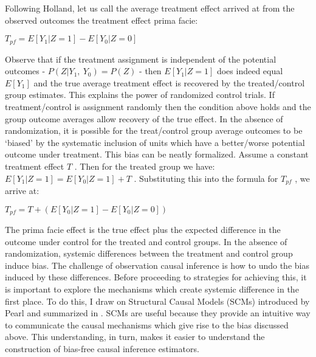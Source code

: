 \documentclass[../main.tex]{subfiles}
\begin{document}
\vspace{\baselineskip}
Following Holland, let us call the average treatment effect arrived at from the observed outcomes the treatment effect prima facie:\par


\vspace{\baselineskip}
\begin{adjustwidth}{0.5in}{0.0in}
 \( T_{pf}=E \left[ Y_{1}  \vert  Z=1 \right]  - E \left[ Y_{0}  \vert  Z=0 \right]  \) \par

\end{adjustwidth}


\vspace{\baselineskip}
Observe that if the treatment assignment is independent of the potential outcomes -  \( P \left( Z  \vert  Y_{1},~Y_{0} \right)  = P \left( Z \right)  \)  - then  \( E \left[ Y_{1}  \vert  Z=1 \right]  \) does indeed equal  \( E \left[ Y_{1} \right]  \)  and the true average treatment effect is recovered by the treated/control group estimates. This explains the power of randomized control trials. If treatment/control is assignment randomly then the condition above holds and the group outcome averages allow recovery of the true effect. In the absence of randomization, it is possible for the treat/control group average outcomes to be ‘biased’ by the systematic inclusion of units which have a better/worse potential outcome under treatment. This bias can be neatly formalized. Assume a constant treatment effect  \( T \) . Then for the treated group we have:  \( E \left[ Y_{1}  \vert  Z=1 \right]  = E \left[ Y_{0}  \vert  Z=1 \right]  + T \) . Substituting this into the formula for  \( T_{pf} \) , we arrive at:\par


\vspace{\baselineskip}
\begin{adjustwidth}{0.5in}{0.0in}
 \( T_{pf} = T + \left( E \left[ Y_{0}  \vert  Z = 1 \right]  - E \left[ Y_{0}  \vert  Z =0 \right]  \right)  \) \par

\end{adjustwidth}


\vspace{\baselineskip}
The prima facie effect is the true effect plus the expected difference in the outcome under control for the treated and control groups. In the absence of randomization, systemic differences between the treatment and control group induce bias. The challenge of observation causal inference is how to undo the bias induced by these differences. Before proceeding to strategies for achieving this, it is important to explore the mechanisms which create systemic difference in the first place. To do this, I draw on Structural Causal Models (SCMs) introduced by Pearl and summarized in \cite{Pearl2009CausalOverview}. SCMs are useful because they provide an intuitive way to communicate the causal mechanisms which give rise to the bias discussed above. This understanding, in turn, makes it easier to understand the construction of bias-free causal inference estimators.\par
\end{document}

